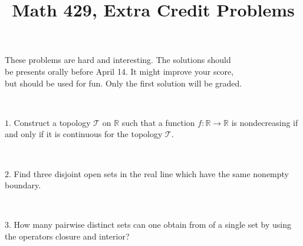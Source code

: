 \documentclass{article}
\def\noi{\noindent}%
\def\RR{\mathbb{R}}%
\def\:{\colon}
\begin{document}
\title{Math 429, Extra Credit Problems}
\author{}
\date{}
\maketitle

\begin{center}
{\small These problems are hard and interesting. The solutions should \\
be presents orally before April 14. It might improve your score,\\
but should be used for fun. Only the first solution will be graded.}
\end{center}
\thispagestyle{empty}

\ 


\noi $1$. Construct a topology $\mathcal{T}$ on $\RR$ such that a function $f\:\RR\to\RR$ is nondecreasing if and only if it is continuous for the topology $\mathcal{T}$.

\ 


\noi $2$. 
Find three disjoint open sets in the real line 
which have the same nonempty boundary. 

\ 

\noi $3$. How many pairwise distinct sets can one obtain
from of a single set by using the operators closure and interior?
\end{document}
